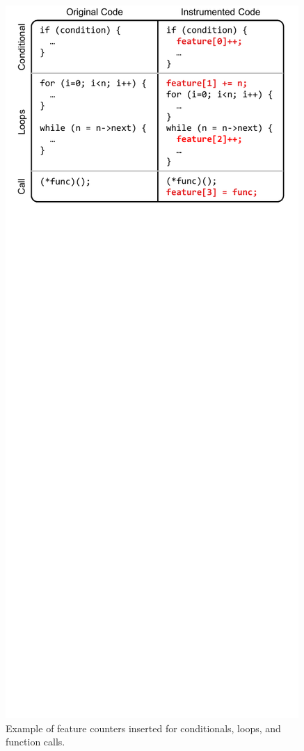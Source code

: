 \begin{figure}
  \begin{center}
    \includegraphics{exec_time_prediction/figs/features.pdf}
    \caption{Example of feature counters inserted for conditionals, loops, and function calls.}
    \label{fig:prediction.features}
  \end{center}
\end{figure}

